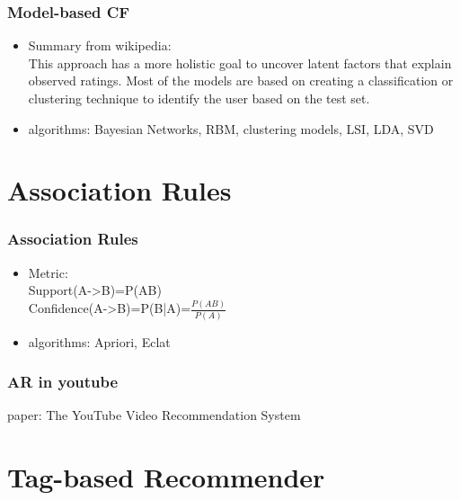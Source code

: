 \documentclass{beamer}
\begin{document}
\begin{frame}
  \frametitle{Model-based CF}

  \begin{itemize}

  \item Summary from wikipedia: \\
  This approach has a more holistic goal to uncover latent factors that explain observed ratings. Most of the models are based on creating a classification or clustering technique to identify the user based on the test set.

  \item algorithms: Bayesian Networks, RBM, clustering models, LSI, LDA, SVD
  \end{itemize}

\end{frame}






\section[AR]{Association Rules}

\begin{frame}
  \frametitle{Association Rules}
  \begin{itemize}

  \item Metric: \\
    Support(A->B)=P(AB) \\
    Confidence(A->B)=P(B|A)=$\frac{P(AB)}{P(A)}$ \\

  \item algorithms: Apriori, Eclat

  \end{itemize}
\end{frame}



\begin{frame}
  \frametitle{AR in youtube}
  paper: The YouTube Video Recommendation System

\end{frame}







\section[tag]{Tag-based Recommender}
\end{document}
